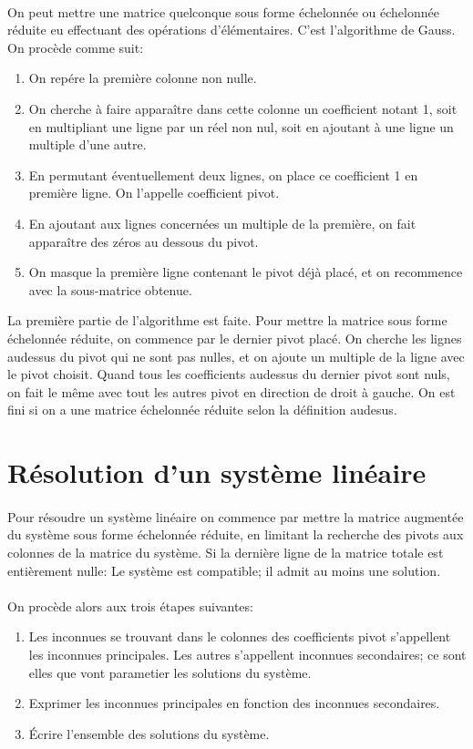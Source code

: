 \paragraph{} On peut mettre une matrice quelconque sous forme échelonnée ou échelonnée réduite eu effectuant des opérations d'élémentaires. C'est l'algorithme de Gauss. \\
On procède comme suit:
\begin{enumerate}
  \item On repére la première colonne non nulle.
  \item On cherche à faire apparaître dans cette colonne un coefficient notant 1, soit en multipliant une ligne par un réel non nul, soit en ajoutant à une ligne un multiple d'une autre.
  \item En permutant éventuellement deux lignes, on place ce coefficient 1 en première ligne. On l'appelle coefficient pivot.
  \item En ajoutant aux lignes concernées un multiple de la première, on fait apparaître des zéros au dessous du pivot. 
  \item On masque la première ligne contenant le pivot déjà placé, et on recommence avec la sous-matrice obtenue.
\end{enumerate}
La première partie de l'algorithme est faite. Pour mettre la matrice sous forme échelonnée réduite, on commence par le dernier pivot placé. On cherche les lignes audessus du pivot qui ne sont pas nulles, et on ajoute un multiple de la ligne avec le pivot choisit. Quand tous les coefficients audessus du dernier pivot sont nuls, on fait le même avec tout les autres pivot en direction de droit à gauche. On est fini si on a une matrice échelonnée réduite selon la définition audesus.

%
%
\section{Résolution d'un système linéaire}
%
%
\paragraph{} Pour résoudre un système linéaire on commence par mettre la matrice augmentée du système sous forme échelonnée réduite, en limitant la recherche des pivots aux colonnes de la matrice du système.
Si la dernière ligne de la matrice totale est entièrement nulle: Le système est compatible; il admit au moins une solution.
\paragraph{}On procède alors aux trois étapes suivantes:
\begin{enumerate}
  \item Les inconnues se trouvant dans le colonnes des coefficients pivot s'appellent les inconnues principales. Les autres s'appellent inconnues secondaires; ce sont elles que vont parametier les solutions du système.
  \item Exprimer les inconnues principales en fonction des inconnues secondaires.
  \item Écrire l'ensemble des solutions du système.
\end{enumerate}
